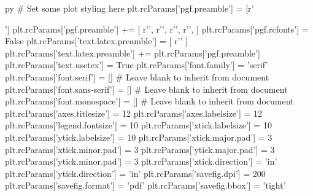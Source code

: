 \begin{pythontexcustomcode}{py}
# Set some plot styling here
plt.rcParams['pgf.preamble'] = [r'\usepackage{siunitx}']
plt.rcParams['pgf.preamble'] += [
	r'\DeclareSIUnit[number-unit-product={}]',
	r'\DeclareSIUnit[number-unit-product={}]',
	r'\DeclareSIUnit[number-unit-product={}]',
	r'\DeclareSIUnit[number-unit-product={}]',
]
plt.rcParams['pgf.rcfonts'] = False
plt.rcParams['text.latex.preamble'] = [
	r'\RequirePackage{mathpazo}'
]
plt.rcParams['text.latex.preamble'] += plt.rcParams['pgf.preamble']
plt.rcParams['text.usetex'] = True
plt.rcParams['font.family'] = 'serif'
plt.rcParams['font.serif'] = [] # Leave blank to inherit from document
plt.rcParams['font.sans-serif'] = [] # Leave blank to inherit from document
plt.rcParams['font.monospace'] = [] # Leave blank to inherit from document
plt.rcParams['axes.titlesize'] = 12
plt.rcParams['axes.labelsize'] = 12
plt.rcParams['legend.fontsize'] = 10
plt.rcParams['xtick.labelsize'] = 10
plt.rcParams['ytick.labelsize'] = 10
plt.rcParams['xtick.major.pad'] = 3
plt.rcParams['xtick.minor.pad'] = 3
plt.rcParams['ytick.major.pad'] = 3
plt.rcParams['ytick.minor.pad'] = 3
plt.rcParams['xtick.direction'] = 'in'
plt.rcParams['ytick.direction'] = 'in'
plt.rcParams['savefig.dpi'] = 200
plt.rcParams['savefig.format'] = 'pdf'
plt.rcParams['savefig.bbox'] = 'tight'

\end{pythontexcustomcode}
